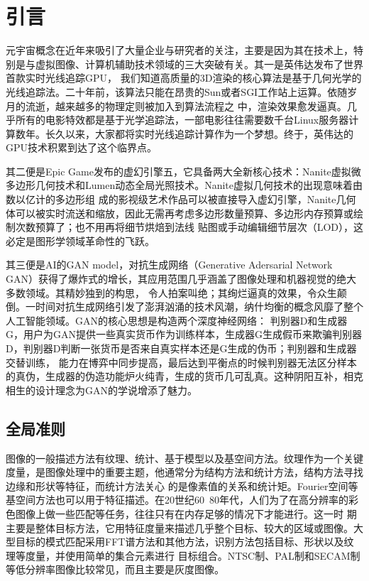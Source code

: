 \section{引言}

元宇宙概念在近年来吸引了大量企业与研究者的关注，主要是因为其在技术上，特别是与虚拟图像、计算机辅助技术领域的三大突破有关。其一是英伟达发布了世界首款实时光线追踪GPU，
我们知道高质量的3D渲染的核心算法是基于几何光学的光线追踪法。二十年前，该算法只能在昂贵的Sun或者SGI工作站上运算。依随岁月的流逝，越来越多的物理定则被加入到算法流程之
中，渲染效果愈发逼真。几乎所有的电影特效都是基于光学追踪法，一部电影往往需要数千台Linux服务器计算数年。长久以来，大家都将实时光线追踪计算作为一个梦想。终于，英伟达的GPU技术积累到达了这个临界点。

其二便是Epic Game发布的虚幻引擎五，它具备两大全新核心技术：Nanite虚拟微多边形几何技术和Lumen动态全局光照技术。Nanite虚拟几何技术的出现意味着由数以亿计的多边形组
成的影视级艺术作品可以被直接导入虚幻引擎，Nanite几何体可以被实时流送和缩放，因此无需再考虑多边形数量预算、多边形内存预算或绘制次数预算了；也不用再将细节烘焙到法线
贴图或手动编辑细节层次（LOD），这必定是图形学领域革命性的飞跃。

其三便是AI的GAN model，对抗生成网络（Generative Adersarial Network GAN）获得了爆炸式的增长，其应用范围几乎涵盖了图像处理和机器视觉的绝大多数领域。其精妙独到的构思，
令人拍案叫绝；其绚烂逼真的效果，令众生颠倒。一时间对抗生成网络引发了澎湃汹涌的技术风潮，纳什均衡的概念风靡了整个人工智能领域。GAN的核心思想是构造两个深度神经网络：
判别器D和生成器G，用户为GAN提供一些真实货币作为训练样本，生成器G生成假币来欺骗判别器D，判别器D判断一张货币是否来自真实样本还是G生成的伪币；判别器和生成器交替训练，
能力在博弈中同步提高，最后达到平衡点的时候判别器无法区分样本的真伪，生成器的伪造功能炉火纯青，生成的货币几可乱真。这种阴阳互补，相克相生的设计理念为GAN的学说增添了魅力。

\subsection{全局准则}

图像的一般描述方法有纹理、统计、基于模型以及基空间方法。纹理作为一个关键度量，是图像处理中的重要主题，他通常分为结构方法和统计方法，结构方法寻找边缘和形状等特征，而统计方法关心
的是像素值的关系和统计矩。Fourier空间等基空间方法也可以用于特征描述。在20世纪60~80年代，人们为了在高分辨率的彩色图像上做一些匹配等任务，往往只有在内存足够的情况下才能进行。这一时
期主要是整体目标方法，它用特征度量来描述几乎整个目标、较大的区域或图像。大型目标的模式匹配采用FFT谱方法和其他方法，识别方法包括目标、形状以及纹理等度量，并使用简单的集合元素进行
目标组合。NTSC制、PAL制和SECAM制等低分辨率图像比较常见，而且主要是灰度图像。

